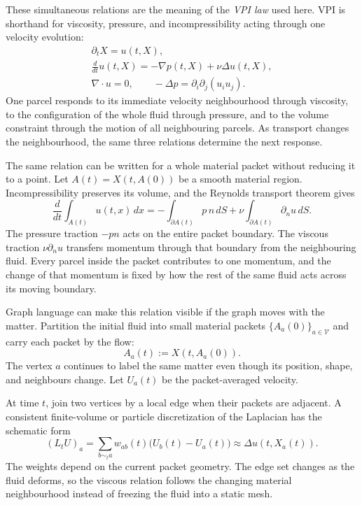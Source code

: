 These simultaneous relations are the meaning of the \emph{VPI law} used here.
VPI is shorthand for viscosity, pressure, and incompressibility acting through one velocity evolution:
\[
  \begin{gathered}
  \partial_tX=u(t,X),\\
  \frac{d}{dt}u(t,X)
  =
  -\nabla p(t,X)
  +
  \nu\Delta u(t,X),\\
  \nabla\cdot u=0,
  \qquad
  -\Delta p=\partial_i\partial_j(u_i u_j).
  \end{gathered}
\]
One parcel responds to its immediate velocity neighbourhood through viscosity, to the configuration of the whole fluid through pressure, and to the volume constraint through the motion of all neighbouring parcels.
As transport changes the neighbourhood, the same three relations determine the next response.

The same relation can be written for a whole material packet without reducing it to a point.
Let \(A(t)=X(t,A(0))\) be a smooth material region.
Incompressibility preserves its volume, and the Reynolds transport theorem gives
\[
  \frac{d}{dt}\int_{A(t)}u(t,x)\,dx
  =
  -\int_{\partial A(t)}p\,n\,dS
  +
  \nu\int_{\partial A(t)}\partial_nu\,dS.
\]
The pressure traction \(-pn\) acts on the entire packet boundary.
The viscous traction \(\nu\partial_nu\) transfers momentum through that boundary from the neighbouring fluid.
Every parcel inside the packet contributes to one momentum, and the change of that momentum is fixed by how the rest of the same fluid acts across its moving boundary.


Graph language can make this relation visible if the graph moves with the matter.
Partition the initial fluid into small material packets \(\{A_a(0)\}_{a\in\mathcal V}\) and carry each packet by the flow:
\[
  A_a(t):=X(t,A_a(0)).
\]
The vertex \(a\) continues to label the same matter even though its position, shape, and neighbours change.
Let \(U_a(t)\) be the packet-averaged velocity.

At time \(t\), join two vertices by a local edge when their packets are adjacent.
A consistent finite-volume or particle discretization of the Laplacian has the schematic form
\[
  (L_tU)_a
  =
  \sum_{b\sim_t a}
  w_{ab}(t)\bigl(U_b(t)-U_a(t)\bigr)
  \approx
  \Delta u(t,X_a(t)).
\]
The weights depend on the current packet geometry.
The edge set changes as the fluid deforms, so the viscous relation follows the changing material neighbourhood instead of freezing the fluid into a static mesh.

